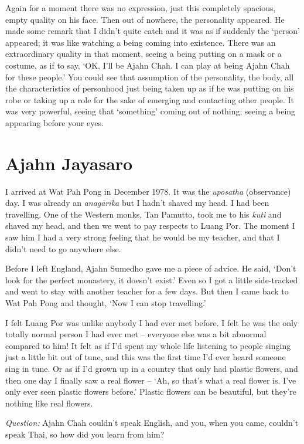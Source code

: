 Again for a moment there was no expression, just this completely
spacious, empty quality on his face. Then out of nowhere, the
personality appeared. He made some remark that I didn't quite catch and
it was as if suddenly the `person' appeared; it was like watching a
being coming into existence. There was an extraordinary quality in that
moment, seeing a being putting on a mask or a costume, as if to say,
`OK, I'll be Ajahn Chah. I can play at being Ajahn Chah for these
people.' You could see that assumption of the personality, the body, all
the characteristics of personhood just being taken up as if he was
putting on his robe or taking up a role for the sake of emerging and
contacting other people. It was very powerful, seeing that `something'
coming out of nothing; seeing a being appearing before your eyes.

\section{Ajahn Jayasaro}

I arrived at Wat Pah Pong in December 1978. It was the \emph{uposatha}
(observance) day. I was already an \emph{anagārika} but I hadn't shaved
my head. I had been travelling. One of the Western monks, Tan Pamutto,
took me to his \emph{kuti} and shaved my head, and then we went to pay
respects to Luang Por. The moment I saw him I had a very strong feeling
that he would be my teacher, and that I didn't need to go anywhere else.

Before I left England, Ajahn Sumedho gave me a piece of advice. He said,
`Don't look for the perfect monastery, it doesn't exist.' Even so I got
a little side-tracked and went to stay with another teacher for a few
days. But then I came back to Wat Pah Pong and thought, `Now I can stop
travelling.'

I felt Luang Por was unlike anybody I had ever met before. I felt he was
the only totally normal person I had ever met -- everyone else was a bit
abnormal compared to him! It felt as if I'd spent my whole life
listening to people singing just a little bit out of tune, and this was
the first time I'd ever heard someone sing in tune. Or as if I'd grown
up in a country that only had plastic flowers, and then one day I
finally saw a real flower -- `Ah, so that's what a real flower is. I've
only ever seen plastic flowers before.' Plastic flowers can be
beautiful, but they're nothing like real flowers.

\emph{Question:} Ajahn Chah couldn't speak English, and you, when you
came, couldn't speak Thai, so how did you learn from him?

